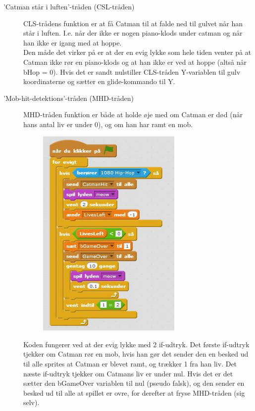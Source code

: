 \documentclass[12pt, a4paper, hidelinks]{article}
\begin{document}
\begin{description}
\item['Catman står i luften'-tråden (CSL-tråden)] CLS-trådens funktion er at få Catman til at falde ned til gulvet når han står i luften. I.e. når der ikke er nogen piano-klods under catman og når han ikke er igang med at hoppe.  \\

Den måde det virker på er at der en evig lykke som hele tiden venter på at Catman ikke rør en piano-klods og at han ikke er ved at hoppe (altså når bHop = 0). Hvis det er sandt nulstiller CLS-tråden Y-variablen til gulv koordinaterne og sætter en glide-kommando til Y. 

\item['Mob-hit-detektions'-tråden (MHD-tråden)] MHD-tråden funktion er både at holde øje med om Catman er død (når hans antal liv er under 0), og om han har ramt en mob. \\

\begin{figure}
  \begin{center}
    \includegraphics[width=70mm]{TKatMobColDetectOgLiv.jpg}
  \end{center}
  \caption{}
  \label{fig:sample}
\end{figure}
\FloatBarrier
  

Koden fungerer ved at der evig lykke med 2 if-udtryk. Det første if-udtryk tjekker om Catman rør en mob, hvis han gør det sender den en besked ud til alle sprites at Catman er blevet ramt, og trækker 1 fra han liv. Det næste if-udtryk tjekker om Catmans liv er under nul. Hvis det er det sætter den bGameOver variablen til nul (pseudo falsk), og den sender en besked ud til alle at spillet er ovre, for derefter at fryse MHD-tråden (sig selv).


\end{description}
\end{document}
